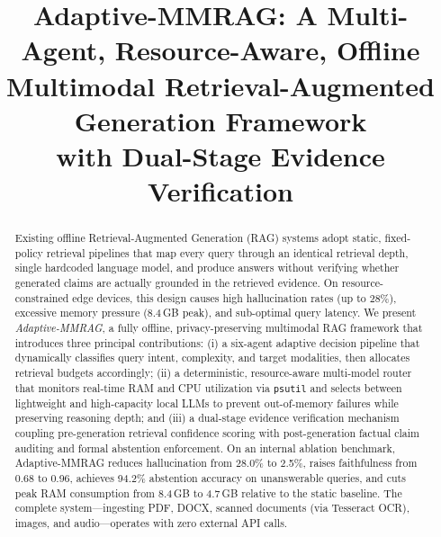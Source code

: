 \documentclass[conference]{IEEEtran}
\begin{document}
\title{Adaptive-MMRAG: A Multi-Agent, Resource-Aware, Offline\\
Multimodal Retrieval-Augmented Generation Framework\\
with Dual-Stage Evidence Verification}

\author{
}

\maketitle

\begin{abstract}
Existing offline Retrieval-Augmented Generation (RAG) systems adopt static,
fixed-policy retrieval pipelines that map every query through an identical
retrieval depth, single hardcoded language model, and produce answers without
verifying whether generated claims are actually grounded in the retrieved
evidence. On resource-constrained edge devices, this design causes high
hallucination rates (up to 28\%), excessive memory pressure (8.4\,GB peak),
and sub-optimal query latency. We present \textit{Adaptive-MMRAG}, a fully
offline, privacy-preserving multimodal RAG framework that introduces three
principal contributions: (i) a six-agent adaptive decision pipeline that
dynamically classifies query intent, complexity, and target modalities, then
allocates retrieval budgets accordingly; (ii) a deterministic,
resource-aware multi-model router that monitors real-time RAM and CPU
utilization via \texttt{psutil} and selects between lightweight and
high-capacity local LLMs to prevent out-of-memory failures while preserving
reasoning depth; and (iii) a dual-stage evidence verification mechanism
coupling pre-generation retrieval confidence scoring with post-generation
factual claim auditing and formal abstention enforcement. On an internal
ablation benchmark, Adaptive-MMRAG reduces hallucination from 28.0\% to
2.5\%, raises faithfulness from 0.68 to 0.96, achieves 94.2\% abstention
accuracy on unanswerable queries, and cuts peak RAM consumption from 8.4\,GB
to 4.7\,GB relative to the static baseline. The complete system—ingesting
PDF, DOCX, scanned documents (via Tesseract OCR), images, and audio—operates
with zero external API calls.
\end{abstract}
\end{document}

